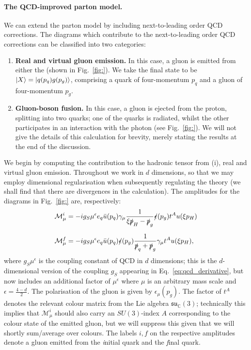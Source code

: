 \documentclass[withindex,glossary]{cam-thesis}
\begin{document}
\paragraph{The QCD-improved parton model.} We can extend the parton model by including next-to-leading order QCD corrections. The diagrams which contribute to the next-to-leading order QCD corrections can be classified into two categories:
\begin{enumerate}[label = (\roman*)]
\item \textbf{Real and virtual gluon emission.} In this case, a gluon is emitted from either the (shown in Fig.~\ref{fig:}). We take the final state to be $\ket{X} = \ket{q(p_q) g(p_g)}$, comprising a quark of four-momentum $p_q$ and a gluon of four-momentum $p_g$.
\item \textbf{Gluon-boson fusion.} In this case, a gluon is ejected from the proton, splitting into two quarks; one of the quarks is radiated, whilst the other participates in an interaction with the photon (see Fig.~\ref{fig:}). We will not give the details of this calculation for brevity, merely stating the results at the end of the discussion.
\end{enumerate}
We begin by computing the contribution to the hadronic tensor from (i), real and virtual gluon emission. Throughout we work in $d$ dimensions, so that we may employ dimensional regularisation when subsequently regulating the theory (we shall find that there are divergences in the calculation). The amplitudes for the diagrams in Fig.~\ref{fig:} are, respectively:
\begin{align}
\mathcal{M}_{\mu}^i &= -i g_S \mu^{\epsilon} e_q \bar{u}(p_{q}) \gamma_{\mu} \frac{1}{\xi \slashed{p}_H - \slashed{p}_{g}}\slashed{\epsilon}(p_{g}) t^A u(\xi p_H)  \\[1.5ex]
\mathcal{M}_{\mu}^f &= -i g_S \mu^{\epsilon} e_q \bar{u}(p_q) \slashed{\epsilon}(p_g) \frac{1}{\slashed{p}_q + \slashed{p}_g} \gamma_{\mu} t^A u(\xi p_H),
\end{align}
where $g_S\mu^{\epsilon}$ is the coupling constant of QCD in $d$ dimensions; this is the $d$-dimensional version of the coupling $g_S$ appearing in Eq.~\eqref{eq:qcd_derivative}, but now includes an additional factor of $\mu^{\epsilon}$ where $\mu$ is an arbitrary mass scale and $\epsilon = \frac{4 - d}{2}$. The polarisation of the gluon is given by $\epsilon_{\mu}(p_g)$. The factor of $t^A$ denotes the relevant colour matrix from the Lie algebra $\mathfrak{su}_{\mathbb{C}}(3)$; technically this implies that $\mathcal{M}_{\mu}^i$ should also carry an $SU(3)$-index $A$ corresponding to the colour state of the emitted gluon, but we will suppress this given that we will shortly sum/average over colours. The labels $i,f$ on the respective amplitudes denote a gluon emitted from the \textit{i}nitial quark and the \textit{f}inal quark.
\end{document}

